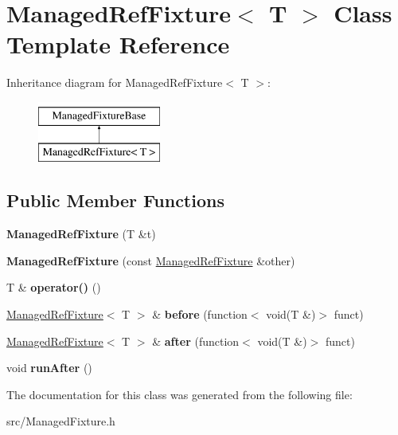 \hypertarget{class_managed_ref_fixture}{\section{Managed\-Ref\-Fixture$<$ T $>$ Class Template Reference}
\label{class_managed_ref_fixture}
}
Inheritance diagram for Managed\-Ref\-Fixture$<$ T $>$\-:\begin{figure}[H]
\begin{center}
\leavevmode
\includegraphics[height=2.000000cm]{class_managed_ref_fixture}
\end{center}
\end{figure}
\subsection*{Public Member Functions}
\begin{DoxyCompactItemize}
\item 
\hypertarget{class_managed_ref_fixture_a40f44a7a01d0ccaae1f8d069a2295f6e}{{\bfseries Managed\-Ref\-Fixture} (T \&t)}\label{class_managed_ref_fixture_a40f44a7a01d0ccaae1f8d069a2295f6e}

\item 
\hypertarget{class_managed_ref_fixture_a70938504412dcb1e3eac465369e483ef}{{\bfseries Managed\-Ref\-Fixture} (const \hyperlink{class_managed_ref_fixture}{Managed\-Ref\-Fixture} \&other)}\label{class_managed_ref_fixture_a70938504412dcb1e3eac465369e483ef}

\item 
\hypertarget{class_managed_ref_fixture_ae45e80c03c99d0afcf4b9fc46a756bee}{T \& {\bfseries operator()} ()}\label{class_managed_ref_fixture_ae45e80c03c99d0afcf4b9fc46a756bee}

\item 
\hypertarget{class_managed_ref_fixture_a6e909e8ff0c9630822a26cc9c7a9d0f0}{\hyperlink{class_managed_ref_fixture}{Managed\-Ref\-Fixture}$<$ T $>$ \& {\bfseries before} (function$<$ void(T \&)$>$ funct)}\label{class_managed_ref_fixture_a6e909e8ff0c9630822a26cc9c7a9d0f0}

\item 
\hypertarget{class_managed_ref_fixture_a7cad6e057b521d46177e22653206d6c2}{\hyperlink{class_managed_ref_fixture}{Managed\-Ref\-Fixture}$<$ T $>$ \& {\bfseries after} (function$<$ void(T \&)$>$ funct)}\label{class_managed_ref_fixture_a7cad6e057b521d46177e22653206d6c2}

\item 
\hypertarget{class_managed_ref_fixture_ade762c90d081b4cd0db5c8c8f1427153}{void {\bfseries run\-After} ()}\label{class_managed_ref_fixture_ade762c90d081b4cd0db5c8c8f1427153}

\end{DoxyCompactItemize}


The documentation for this class was generated from the following file\-:\begin{DoxyCompactItemize}
\item 
src/Managed\-Fixture.\-h\end{DoxyCompactItemize}
